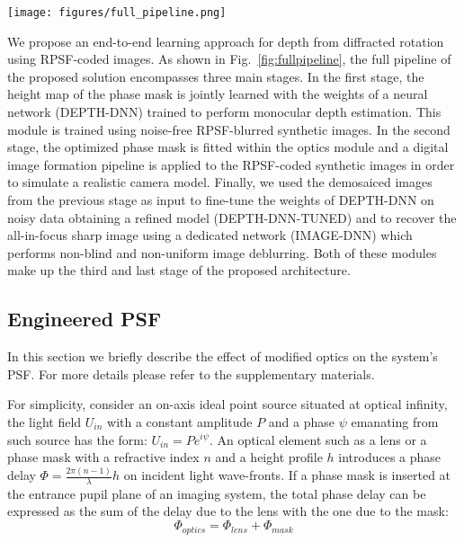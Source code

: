\documentclass[preprint,5p,twocolumn]{elsarticle}
\begin{document}
\begin{figure*}[h!]
\begin{center}
\texttt{[image: figures/full\_pipeline.png]}
\end{center}
   \caption{The full architecture of our end-to-end learning framework.}
\label{fig:fullpipeline}
\end{figure*}


We propose an end-to-end learning approach for depth from diffracted rotation using RPSF-coded images. As shown in Fig.~\ref{fig:fullpipeline}, the full pipeline of the proposed solution encompasses three main stages. In the first stage, the height map of the phase mask is jointly learned  with the weights of a neural network (DEPTH-DNN) trained to perform monocular depth estimation. This module is trained using noise-free RPSF-blurred synthetic images. In the second stage, the optimized phase mask is fitted within the optics module and a digital image formation pipeline is applied to the RPSF-coded synthetic images in order to simulate a realistic camera model. Finally, we used the demosaiced images from the previous stage as input to fine-tune the weights of DEPTH-DNN on noisy data obtaining a refined model (DEPTH-DNN-TUNED) and to recover the all-in-focus sharp image using a dedicated network (IMAGE-DNN) which performs non-blind and non-uniform image deblurring. Both of these modules make up the third and last stage of the proposed architecture. 

\subsection{Engineered PSF}
In this section we briefly describe the effect of modified optics on the system's PSF. For more details please refer to the supplementary materials. 

For simplicity, consider an on-axis ideal point source situated at optical infinity, the light field $U_{in}$ with a constant amplitude $P$ and a phase $\psi$ emanating from such source has the form:
$U_{in}=Pe^{i\psi}$.
An optical element such as a lens or a phase mask with a refractive index $n$ and a height profile $h$ introduces a phase delay $\Phi = \frac{2\pi (n-1)}{\lambda}h$ on incident light wave-fronts. If a phase mask is inserted at the entrance pupil plane of an imaging system, the total phase delay can be expressed as the sum of the delay due to the lens with the one due to the mask: 
\begin{equation}
    \Phi_{optics} = \Phi_{lens} + \Phi_{mask}
\end{equation}
\end{document}

